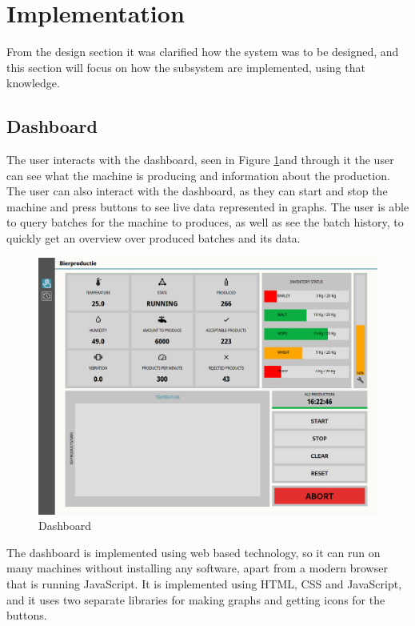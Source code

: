 \section{Implementation}
From the design section it was clarified how the system was to be designed, and
this section will focus on how the subsystem are implemented, using that
knowledge.

\subsection{Dashboard}
The user interacts with the dashboard, seen in Figure \ref{figure:dashboard}and
through it the user can see what the machine is producing and information about
the production. The user can also interact with the dashboard, as they can start
and stop the machine and press buttons to see live data represented in graphs.
The user is able to query batches for the machine to produces, as well as see
the batch history, to quickly get an overview over produced batches and its data.\\

\begin{figure}[ht]
	\centering
	\includegraphics[width=1\linewidth]{images/dashboard.png}
	\caption{Dashboard}
	\label{figure:dashboard}
\end{figure}

The dashboard is implemented using web based technology, so it can run on many
machines without installing any software, apart from a modern browser that is
running JavaScript. It is implemented using HTML, CSS and JavaScript, and it
uses two separate libraries for making graphs and getting icons for the buttons.

